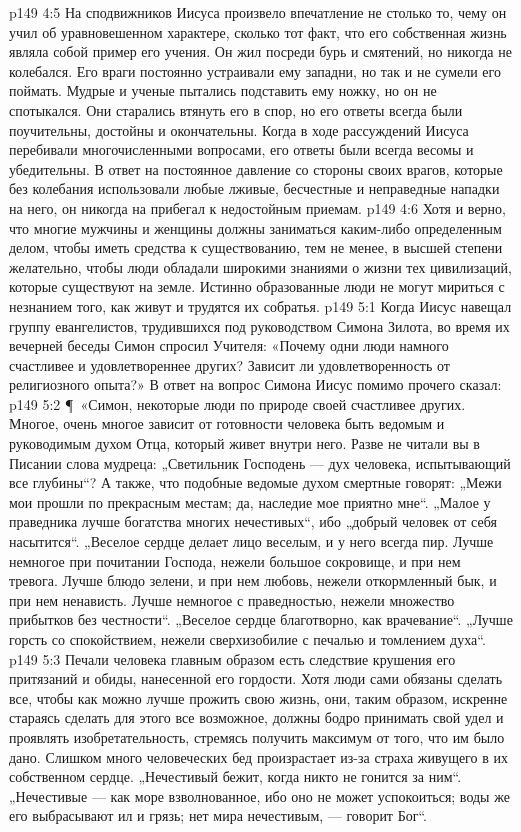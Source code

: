 \vs p149 4:5 На сподвижников Иисуса произвело впечатление не столько то, чему он учил об уравновешенном характере, сколько тот факт, что его собственная жизнь являла собой пример его учения. Он жил посреди бурь и смятений, но никогда не колебался. Его враги постоянно устраивали ему западни, но так и не сумели его поймать. Мудрые и ученые пытались подставить ему ножку, но он не спотыкался. Они старались втянуть его в спор, но его ответы всегда были поучительны, достойны и окончательны. Когда в ходе рассуждений Иисуса перебивали многочисленными вопросами, его ответы были всегда весомы и убедительны. В ответ на постоянное давление со стороны своих врагов, которые без колебания использовали любые лживые, бесчестные и неправедные нападки на него, он никогда на прибегал к недостойным приемам.
\vs p149 4:6 Хотя и верно, что многие мужчины и женщины должны заниматься каким\hyp{}либо определенным делом, чтобы иметь средства к существованию, тем не менее, в высшей степени желательно, чтобы люди обладали широкими знаниями о жизни тех цивилизаций, которые существуют на земле. Истинно образованные люди не могут мириться с незнанием того, как живут и трудятся их собратья.
\vs p149 5:1 Когда Иисус навещал группу евангелистов, трудившихся под руководством Симона Зилота, во время их вечерней беседы Симон спросил Учителя: «Почему одни люди намного счастливее и удовлетвореннее других? Зависит ли удовлетворенность от религиозного опыта?» В ответ на вопрос Симона Иисус помимо прочего сказал:
\vs p149 5:2 \P\ «Симон, некоторые люди по природе своей счастливее других. Многое, очень многое зависит от готовности человека быть ведомым и руководимым духом Отца, который живет внутри него. Разве не читали вы в Писании слова мудреца: „Светильник Господень --- дух человека, испытывающий все глубины“? А также, что подобные ведомые духом смертные говорят: „Межи мои прошли по прекрасным местам; да, наследие мое приятно мне“. „Малое у праведника лучше богатства многих нечестивых“, ибо „добрый человек от себя насытится“. „Веселое сердце делает лицо веселым, и у него всегда пир. Лучше немногое при почитании Господа, нежели большое сокровище, и при нем тревога. Лучше блюдо зелени, и при нем любовь, нежели откормленный бык, и при нем ненависть. Лучше немногое с праведностью, нежели множество прибытков без честности“. „Веселое сердце благотворно, как врачевание“. „Лучше горсть со спокойствием, нежели сверхизобилие с печалью и томлением духа“.
\vs p149 5:3 Печали человека главным образом есть следствие крушения его притязаний и обиды, нанесенной его гордости. Хотя люди сами обязаны сделать все, чтобы как можно лучше прожить свою жизнь, они, таким образом, искренне стараясь сделать для этого все возможное, должны бодро принимать свой удел и проявлять изобретательность, стремясь получить максимум от того, что им было дано. Слишком много человеческих бед произрастает из\hyp{}за страха живущего в их собственном сердце. „Нечестивый бежит, когда никто не гонится за ним“. „Нечестивые --- как море взволнованное, ибо оно не может успокоиться; воды же его выбрасывают ил и грязь; нет мира нечестивым, --- говорит Бог“.
